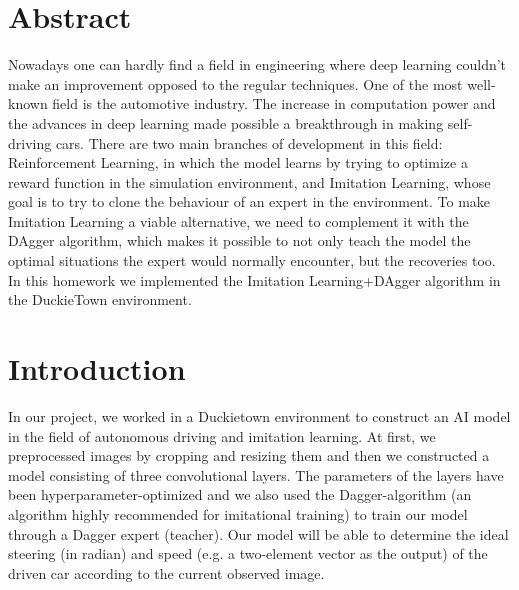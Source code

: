 \documentclass{article}
\begin{document}

\vspace*{2\baselineskip}
\vspace*{2\baselineskip}
\vspace*{2\baselineskip}

\section*{Abstract}
Nowadays one can hardly find a field in engineering where deep learning couldn’t make an improvement opposed to the regular techniques.
One of the most well-known field is the automotive industry. The increase in computation power and the advances in deep learning made possible a breakthrough in making self-driving cars. There are two main branches of development in this field: Reinforcement Learning, in which the model learns by trying to optimize a reward function in the simulation environment, and Imitation Learning, whose goal is to try to clone the behaviour of an expert in the environment.
To make Imitation Learning a viable alternative, we need to complement it with the DAgger algorithm, which makes it possible to not only teach the model the optimal situations the expert would normally encounter, but the recoveries too.
In this homework we implemented the Imitation Learning+DAgger algorithm in the DuckieTown environment.

\pagebreak


\section*{Introduction}
In our project, we worked in a Duckietown environment to construct an AI model in the field of autonomous driving and imitation learning. At first, we preprocessed images by cropping and resizing them and then  we constructed a model consisting of three convolutional layers. The parameters of the layers have been hyperparameter-optimized and we also used the Dagger-algorithm (an algorithm highly recommended for imitational training) to train our model through a Dagger expert (teacher). Our model will be able to determine the ideal steering (in radian) and speed (e.g. a two-element vector as the output) of the driven car according to the current observed image.

\vspace*{2\baselineskip}

\end{document}
